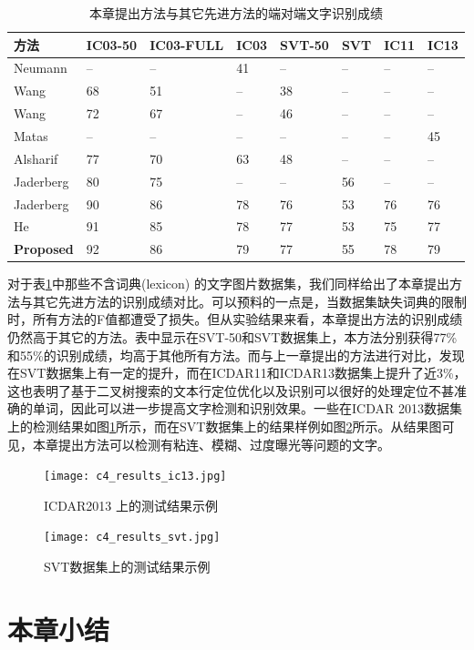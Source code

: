         \begin{table}[!h]
        \centering
        \caption{本章提出方法与其它先进方法的端对端文字识别成绩}
        \begin{tabular}{l|l l l l l l l}
        \hline
        方法 & IC03-50 & IC03-FULL & IC03 & SVT-50 & SVT & IC11 & IC13  \\
        \hline
        Neumann\cite{Neumann2010A} & -- & -- & 41 & -- & -- & -- & -- \\
        Wang\cite{Wang2012End} & 68 & 51 & -- & 38 & -- & -- & -- \\
        Wang\cite{Wang2012End} & 72 & 67 & -- & 46 & -- & -- & -- \\
        Matas\cite{Matas2014Scene} & -- & -- & -- & -- & -- & -- & 45 \\
        Alsharif\cite{Alsharif2013End} & 77 & 70 & 63 & 48 & -- & -- & -- \\
        Jaderberg\cite{Jaderberg2014Deep} & 80 & 75 & -- & -- & 56 & -- & -- \\
        Jaderberg\cite{Jaderberg2016Reading} & 90 & 86 & 78 & 76 & 53 & 76 & 76 \\
        He\cite{He2017scene} & 91 & 85 & 78 & 77 & 53 & 75 & 77 \\
        \textbf{Proposed} & 92 & 86 & 79 & 77 & 55 & 78 & 79 \\
        \hline
        \end{tabular}
        \label{tab.c4_recognition}
        \end{table}

        对于表\ref{tab.c4_recognition}中那些不含词典(lexicon) 的文字图片数据集，我们同样给出了本章提出方法与其它先进方法的识别成绩对比。可以预料的一点是，当数据集缺失词典的限制时，所有方法的F值都遭受了损失。但从实验结果来看，本章提出方法的识别成绩仍然高于其它的方法。表中显示在SVT-50和SVT数据集上，本方法分别获得77\%和55\%的识别成绩，均高于其他所有方法。而与上一章提出的方法进行对比，发现在SVT数据集上有一定的提升，而在ICDAR11和ICDAR13数据集上提升了近3\%，这也表明了基于二叉树搜索的文本行定位优化以及识别可以很好的处理定位不甚准确的单词，因此可以进一步提高文字检测和识别效果。一些在ICDAR 2013数据集上的检测结果如图\ref{fig.c4_results_ic13}所示，而在SVT数据集上的结果样例如图\ref{fig.c4_results_svt}所示。从结果图可见，本章提出方法可以检测有粘连、模糊、过度曝光等问题的文字。
        
        \begin{figure}[!h]
        \centering
        \texttt{[image: c4\_results\_ic13.jpg]}
        \caption{ICDAR2013 上的测试结果示例}
        \label{fig.c4_results_ic13}
        \end{figure}

        \begin{figure}[!h]
        \centering
        \texttt{[image: c4\_results\_svt.jpg]}
        \caption{SVT数据集上的测试结果示例}
        \label{fig.c4_results_svt}
        \end{figure}


    \section{本章小结}


